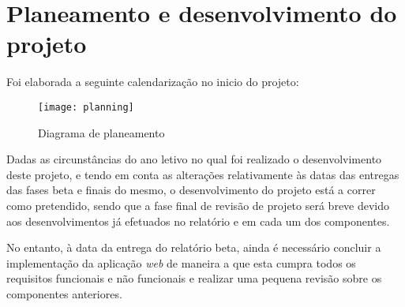 \section{Planeamento e desenvolvimento do projeto} 
Foi elaborada a seguinte calendarização no inicio do projeto:

\begin{figure}[h]
	\centering
	\texttt{[image: planning]}
	\caption{Diagrama de planeamento}
\end{figure}

Dadas as circunstâncias do ano letivo no qual foi realizado o desenvolvimento deste projeto, e tendo em conta as alterações relativamente às datas das entregas das fases beta e finais do mesmo, o desenvolvimento do projeto está a correr como pretendido, sendo que a fase final de revisão de projeto será breve devido aos desenvolvimentos já efetuados no relatório e em cada um dos componentes. \par \medskip

No entanto, à data da entrega do relatório beta, ainda é necessário concluir a implementação da aplicação \textit{web} de maneira a que esta cumpra todos os requisitos funcionais e não funcionais e realizar uma pequena revisão sobre os componentes anteriores.